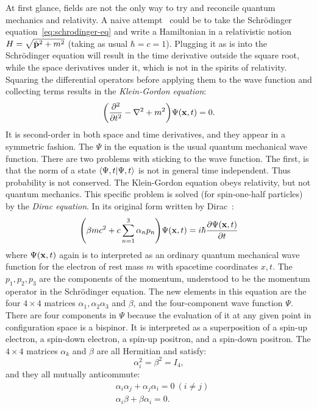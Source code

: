 At first glance, fields are not the only way to try and reconcile quantum mechanics and relativity. A naive attempt~\cite{Srednicki2007-mn} could be to take the Schrödinger equation~\ref{eq:schrodinger-eq} and write a Hamiltonian in a relativistic notion $H=\sqrt{\hat{\vb{p}}^2+m^2}$ (taking as usual $\hbar=c=1$). Plugging it as is into the Schrödinger equation will result in the time derivative outside the square root, while the space derivatives under it, which is not in the spirits of relativity. Squaring the differential operators before applying them to the wave function and collecting terms results in the \emph{Klein-Gordon equation}:
\begin{equation}
\qty(\pdv[2]{t}-\nabla^2+m^2)\Psi\qty(\vb{x},t)=0.
\label{eq:kg-wf}
\end{equation}
It is second-order in both space and time derivatives, and they appear in a symmetric fashion. The $\Psi$ in the equation is the usual quantum mechanical wave function. There are two problems with sticking to the wave function. The first, is that the norm of a state $\braket{\Psi,t}$ is not in general time independent. Thus probability is not conserved. The Klein-Gordon equation obeys relativity, but not quantum mechanics. This specific problem is solved (for spin-one-half particles) by the \emph{Dirac equation}. In its original form written by Dirac~\cite{Dirac1981-rt}:
\begin{equation}
\qty(\beta m c^2 + c\sum^3_{n=1}\alpha_n p_n)\Psi\qty(\vb{x},t)=i\hbar\pdv{\Psi\qty(\vb{x},t)}{t}
\label{eq:dirac-wf}
\end{equation}
where $\Psi\qty(\vb{x},t)$ again is to interpreted as an ordinary quantum mechanical wave function for the electron of rest mass $m$ with spacetime coordinates $x, t$. The $p_1,p_2,p_3$ are the components of the momentum, understood to be the momentum operator in the Schrödinger equation. The new elements in this equation are the four $4\times 4$ matrices $\alpha_1,\alpha_2\alpha_3$ and $\beta$, and the four-component wave function $\Psi$. There are four components in $\Psi$ because the evaluation of it at any given point in configuration space is a bispinor. It is interpreted as a superposition of a spin-up electron, a spin-down electron, a spin-up positron, and a spin-down positron. The $4\times 4$ matrices $\alpha_k$ and $\beta$ are all Hermitian and satisfy:
\begin{equation}
\alpha_i^2=\beta^2=I_4,
\end{equation}
and they all mutually anticommute:
\begin{equation}
\begin{split}
&\alpha_i \alpha_j + \alpha_j \alpha_i = 0 \:(i\neq j) \\
&\alpha_i \beta + \beta \alpha_i = 0.
\end{split}
\end{equation}
